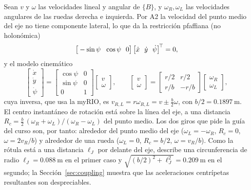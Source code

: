 Sean $v$ y $\omega$ las velocidades lineal y angular de $\{B\}$, y $\omega_R,\omega_L$ las velocidades angulares de las ruedas derecha e izquierda. Por A2 la velocidad del punto medio del eje no tiene componente lateral, lo que da la restricción pfaffiana (no holonómica)
\begin{equation}
  \big[-\sin\psi\ \ \cos\psi\ \ 0\big]\,\big[\dot x\ \ \dot y\ \ \dot\psi\big]^{\!\top}=0,
  \label{eq:pfaff}
\end{equation}
y el modelo cinemático \cite{siegwart2011,campion1996}
\begin{equation}
  \begin{bmatrix}\dot x\\ \dot y\\ \dot\psi\end{bmatrix}=\begin{bmatrix}\cos\psi&0\\ \sin\psi&0\\ 0&1\end{bmatrix}\begin{bmatrix}v\\ \omega\end{bmatrix},\qquad
  \begin{bmatrix}v\\ \omega\end{bmatrix}=\begin{bmatrix}r/2 & r/2\\ r/b & -r/b\end{bmatrix}\begin{bmatrix}\omega_R\\ \omega_L\end{bmatrix},
  \label{eq:diff}
\end{equation}
cuya inversa, que usa la myRIO, es $v_{R,L}=r\omega_{R,L}=v\pm\tfrac{b}{2}\omega$, con $b/2=\SI{0.1897}{\metre}$. El centro instantáneo de rotación está sobre la línea del eje, a una distancia $R_c=\tfrac{b}{2}\,(\omega_R+\omega_L)/(\omega_R-\omega_L)$ del punto medio. Los dos giros que pide la guía del curso son, por tanto: alrededor del punto medio del eje ($\omega_L=-\omega_R$, $R_c=0$, $\omega=2v_R/b$) y alrededor de una rueda ($\omega_L=0$, $R_c=b/2$, $\omega=v_R/b$). Como la rótula está a una distancia $\ell_J$ por delante del eje, describe una circunferencia de radio $\ell_J=\SI{0.088}{\metre}$ en el primer caso y $\sqrt{(b/2)^2+\ell_J^2}=\SI{0.209}{\metre}$ en el segundo; la Sección~\ref{sec:coupling} muestra que las aceleraciones centrípetas resultantes son despreciables.

